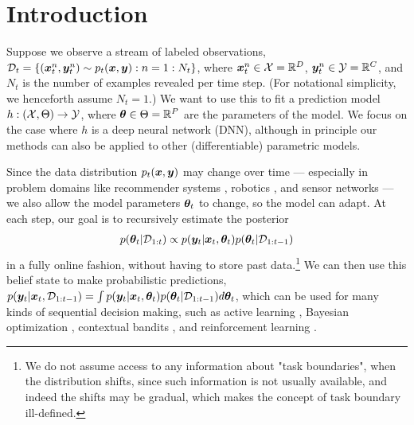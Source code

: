 

\section{Introduction}


Suppose we observe a stream of labeled observations,
${\mathcal{D}}_t=
\{({\bm{x}}_t^n, {\bm{y}}_t^n) \sim p_t({\bm{x}},{\bm{y}}): n=1:N_t\}$, where ${\bm{x}}_t^n \in \mathcal{X} = \mathbb{R}^D$,
${\bm{y}}_t^n \in \mathcal{Y} = \mathbb{R}^C$,
and $N_t$ is the number of examples revealed
per time step.
(For notational simplicity, we henceforth assume
$N_t=1$.)
We want to use this to fit a prediction model $h: (\mathcal{X}, \Theta) \rightarrow \mathcal{Y}$, where ${\bm{\theta}} \in \Theta = \mathbb{R}^P$ are the parameters of the model.
We focus on the case where $h$ is a deep neural network (DNN),
although in principle our methods can also be applied to other (differentiable) parametric models.

Since the data distribution $p_t({\bm{x}},{\bm{y}})$ may change over time
---
especially in problem domains like 
recommender systems  \citep{Huang2015},
robotics \citep{Wolczyk2021,Lesort2020},
and sensor networks \citep{Ditzler2015}
---
we also allow the model parameters ${\bm{\theta}}_t$ to change, so the model can adapt.
At each step, our goal is to recursively estimate the posterior 
\begin{align}
p({\bm{\theta}}_t|{\mathcal{D}}_{1:t})
 \propto p({\bm{y}}_t|{\bm{x}}_t,{\bm{\theta}}_t) p({\bm{\theta}}_t|{\mathcal{D}}_{1:t-1})
 \label{eqn:post}
\end{align}
in a fully online fashion, without having
to store past data.\footnote{
%
We do not assume access to any information
about "task boundaries", when the distribution shifts,
since such information is not usually available,
and indeed the shifts may be gradual, which makes the concept of task boundary ill-defined.
} %
We can then use this belief state to make probabilistic predictions, $p({\bm{y}}_t|{\bm{x}}_t,{\mathcal{D}}_{1:t-1}) = \int p({\bm{y}}_t|{\bm{x}}_t,{\bm{\theta}}_t) p({\bm{\theta}}_t|{\mathcal{D}}_{1:t-1}) d{\bm{\theta}}_t$,
which can be used for many kinds of sequential
decision making,
such as
active learning \citep{Holzmuller2022},
Bayesian optimization \citep{Garnett2023},
contextual bandits \citep{Duran-Martin2022},
and reinforcement learning \citep{Khetarpal2022,Wang2021}.

